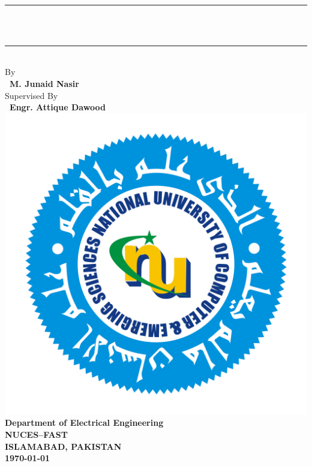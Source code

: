 \documentclass[11pt, a4paper, oneside]{Thesis} %
\begin{document}
\begin{titlepage}
\begin{center}

\textsc{\LARGE \univname}\\[0.5cm] %
\rule{\linewidth}{0.5mm}\\[0.3cm]
{\Large \bfseries \ttitle}\\
\rule{\linewidth}{0.5mm}\\[0.5cm]

{\large By}\\[0.2cm]
{\large \bfseries \ M. Junaid Nasir}\\[1.5cm]


{\large Supervised By}\\[0.2cm]
{\large \bfseries \ Engr. Attique Dawood}\\[1.9cm]


\includegraphics[scale=0.15]{Figures/NU_Logo.png}\\[0.8cm]

{\large \bfseries Department of Electrical Engineering}\\[0.2cm]
{\large \bfseries NUCES--FAST}\\[0.2cm]
{\large \bfseries ISLAMABAD, PAKISTAN}\\[0.2cm]
{\large \bfseries \today}

\end{center}
\end{titlepage}
\end{document}
